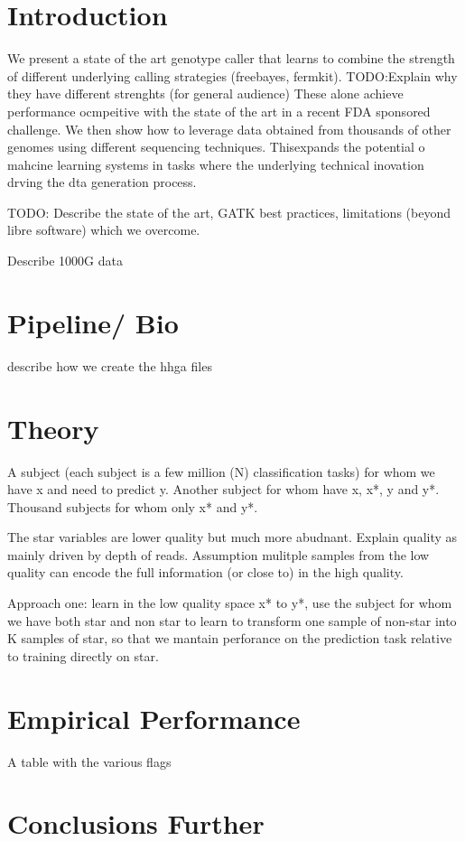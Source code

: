 \documentclass[11pt, a4paper]{article}
\title{} %
\author{NDP,EG, PD?}
\date{\today}
\begin{document}
\maketitle




\section{Introduction}

We present a state of the art genotype caller that learns to combine the strength of different underlying calling strategies (freebayes, fermkit).
TODO:Explain why they have different strenghts (for general audience) 
These alone achieve performance ocmpeitive with the state of the art in a recent FDA sponsored challenge.
We then show how to leverage data obtained from thousands of other genomes using different sequencing techniques. 
Thisexpands the potential o mahcine learning systems in tasks where the underlying technical inovation drving the dta generation process. 

TODO: Describe the state of the art, GATK best practices, limitations (beyond libre software) which we overcome.


Describe 1000G data  

\section{Pipeline/ Bio}

describe how we create the hhga files

\section{Theory}

A subject (each subject is  a few million (N) classification tasks) for whom we have  x and  need to predict y.
Another subject for whom have x,  x*,  y and  y*.
Thousand subjects for whom only x* and y*.

The star variables are lower quality but much more abudnant.
Explain quality as mainly driven by depth of reads.
Assumption mulitple samples from the low quality can encode the full information (or close to) in the high quality.

Approach one: learn in the low quality space x* to y*, use the subject for whom we have both star and non star to learn to transform one sample of non-star into K samples of star, so that we mantain perforance on the prediction task relative to training directly on star.





\section{Empirical Performance}

A table with the various flags

\section{Conclusions Further}
\end{document}
